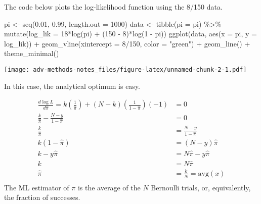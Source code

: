 \documentclass[
]{book}
\newenvironment{Shaded}{\begin{snugshade}}{\end{snugshade}}
\newcommand{\AttributeTok}[1]{\textcolor[rgb]{0.77,0.63,0.00}{#1}}
\newcommand{\DecValTok}[1]{\textcolor[rgb]{0.00,0.00,0.81}{#1}}
\newcommand{\FloatTok}[1]{\textcolor[rgb]{0.00,0.00,0.81}{#1}}
\newcommand{\FunctionTok}[1]{\textcolor[rgb]{0.00,0.00,0.00}{#1}}
\newcommand{\NormalTok}[1]{#1}
\newcommand{\OtherTok}[1]{\textcolor[rgb]{0.56,0.35,0.01}{#1}}
\newcommand{\SpecialCharTok}[1]{\textcolor[rgb]{0.00,0.00,0.00}{#1}}
\newcommand{\StringTok}[1]{\textcolor[rgb]{0.31,0.60,0.02}{#1}}
\begin{document}
The code below plots the log-likelihood function using the 8/150 data.

\begin{Shaded}
\begin{Highlighting}[]
\NormalTok{pi }\OtherTok{\textless{}{-}} \FunctionTok{seq}\NormalTok{(}\FloatTok{0.01}\NormalTok{, }\FloatTok{0.99}\NormalTok{, }\AttributeTok{length.out =} \DecValTok{1000}\NormalTok{)}
\NormalTok{data }\OtherTok{\textless{}{-}} \FunctionTok{tibble}\NormalTok{(}\AttributeTok{pi =}\NormalTok{ pi) }\SpecialCharTok{\%\textgreater{}\%}
  \FunctionTok{mutate}\NormalTok{(}\AttributeTok{log\_lik =} \DecValTok{18}\SpecialCharTok{*}\FunctionTok{log}\NormalTok{(pi) }\SpecialCharTok{+}\NormalTok{ (}\DecValTok{150} \SpecialCharTok{{-}} \DecValTok{8}\NormalTok{)}\SpecialCharTok{*}\FunctionTok{log}\NormalTok{(}\DecValTok{1} \SpecialCharTok{{-}}\NormalTok{ pi))}
\FunctionTok{ggplot}\NormalTok{(data, }\FunctionTok{aes}\NormalTok{(}\AttributeTok{x =}\NormalTok{ pi, }\AttributeTok{y =}\NormalTok{ log\_lik)) }\SpecialCharTok{+} 
  \FunctionTok{geom\_vline}\NormalTok{(}\AttributeTok{xintercept =} \DecValTok{8}\SpecialCharTok{/}\DecValTok{150}\NormalTok{, }\AttributeTok{color =} \StringTok{"green"}\NormalTok{) }\SpecialCharTok{+} 
  \FunctionTok{geom\_line}\NormalTok{() }\SpecialCharTok{+} 
  \FunctionTok{theme\_minimal}\NormalTok{()}
\end{Highlighting}
\end{Shaded}

\texttt{[image: adv-methods-notes\_files/figure-latex/unnamed-chunk-2-1.pdf]}

In this case, the analytical optimum is easy.

\[
\begin{aligned}
\frac{d \log L}{d\hat{\pi}} = k \left( \frac{1}{\hat{\pi}}\right) + (N - k) \left( \frac{1}{1 - \hat{\pi}}\right)(-1) &= 0\\
\frac{k}{\hat{\pi}} - \frac{N - y}{1 - \hat{\pi}} &= 0 \\
\frac{k}{\hat{\pi}} &= \frac{N - y}{1 - \hat{\pi}} \\
k(1 - \hat{\pi}) &= (N - y)\hat{\pi} \\
k - y\hat{\pi} &= N\hat{\pi} - y\hat{\pi} \\
k  &= N\hat{\pi} \\
\hat{\pi} &= \frac{k}{N} = \text{avg}(x)\\
\end{aligned}
\] The ML estimator of \(\pi\) is the average of the \(N\) Bernoulli
trials, or, equivalently, the fraction of successes.
\end{document}
